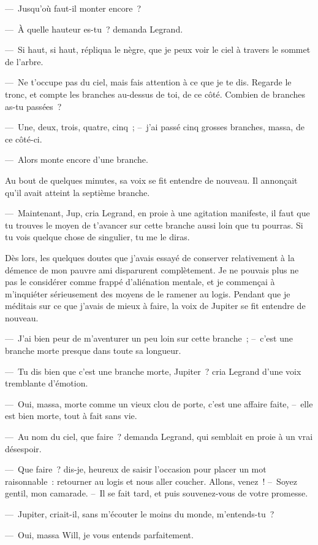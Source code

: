 \documentclass[french,twoside]{book} %
\begin{document}
— Jusqu’où faut-il monter encore ?\par
— À quelle hauteur es-tu ? demanda Legrand.\par
— Si haut, si haut, répliqua le nègre, que je peux voir le ciel à travers le sommet de l’arbre.\par
— Ne t’occupe pas du ciel, mais fais attention à ce que je te dis. Regarde le tronc, et compte les branches au-dessus de toi, de ce côté. Combien de branches as-tu passées ?\par
— Une, deux, trois, quatre, cinq ; – j’ai passé cinq grosses branches, massa, de ce côté-ci.\par
— Alors monte encore d’une branche.\par
Au bout de quelques minutes, sa voix se fit entendre de nouveau. Il annonçait qu’il avait atteint la septième branche.\par
— Maintenant, Jup, cria Legrand, en proie à une agitation manifeste, il faut que tu trouves le moyen de t’avancer sur cette branche aussi loin que tu pourras. Si tu vois quelque chose de singulier, tu me le diras.\par
Dès lors, les quelques doutes que j’avais essayé de conserver relativement à la démence de mon pauvre ami disparurent complètement. Je ne pouvais plus ne pas le considérer comme frappé d’aliénation mentale, et je commençai à m’inquiéter sérieusement des moyens de le ramener au logis. Pendant que je méditais sur ce que j’avais de mieux à faire, la voix de Jupiter se fit entendre de nouveau.\par
— J’ai bien peur de m’aventurer un peu loin sur cette branche ; – c’est une branche morte presque dans toute sa longueur.\par
— Tu dis bien que c’est une branche morte, Jupiter ? cria Legrand d’une voix tremblante d’émotion.\par
— Oui, massa, morte comme un vieux clou de porte, c’est une affaire faite, – elle est bien morte, tout à fait sans vie.\par
— Au nom du ciel, que faire ? demanda Legrand, qui semblait en proie à un vrai désespoir.\par
— Que faire ? dis-je, heureux de saisir l’occasion pour placer un mot raisonnable : retourner au logis et nous aller coucher. Allons, venez ! – Soyez gentil, mon camarade. – Il se fait tard, et puis souvenez-vous de votre promesse.\par
— Jupiter, criait-il, sans m’écouter le moins du monde, m’entends-tu ?\par
— Oui, massa Will, je vous entends parfaitement.\par
\end{document}
